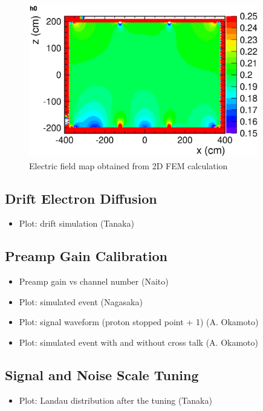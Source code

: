 \begin{figure}[htbp]
 \begin{center}
  \includegraphics[width=100mm]{fig/2DFieldMap.eps}
 \end{center}
 \caption{Electric field map obtained from 2D FEM calculation}
 \label{Fig:2DFieldMap}
\end{figure}


\subsection{Drift Electron Diffusion}
\begin{itemize}
\item Plot: drift simulation  (Tanaka)
\end{itemize}

\subsection{Preamp Gain Calibration}
\begin{itemize}
\item Preamp gain vs channel number  (Naito)
\end{itemize}


\begin{itemize}
\item Plot: simulated event  (Nagasaka)
\end{itemize}


\begin{itemize}
\item Plot: signal waveform (proton stopped point + 1)  (A. Okamoto)
\item Plot: simulated event with and without cross talk (A. Okamoto)
\end{itemize}

\subsection{Signal and Noise Scale Tuning}
\begin{itemize}
\item Plot: Landau distribution after the tuning  (Tanaka)
\end{itemize}

